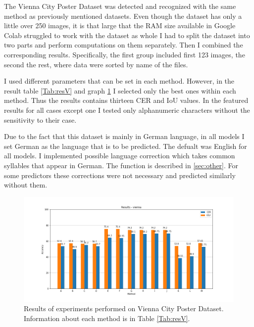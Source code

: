 The Vienna City Poster Dataset was detected and recognized with the same method as previously mentioned datasets. Even though the dataset has only a little over 250 images, it is that large that the RAM size available in Google Colab struggled to work with the dataset as whole I had to split the dataset into two parts and perform computations on them separately. Then I combined the corresponding results. Specifically, the first group included first 123 images, the second the rest, where data were sorted by name of the files.

I used different parameters that can be set in each method. However, in the result table \ref*{Tab:resV} and graph \ref*{Im:resV} I selected only the best ones within each method. Thus the results contains     thirteen CER and IoU values. In the featured results for all cases except one I tested only alphanumeric characters without the sensitivity to their case.

Due to the fact that this dataset is mainly in German language, in all models I set German as the language that is to be predicted. The defualt was English for all models. I implemented possible language correction which takes common syllables that appear in German. The function is described in \ref{sec:other}. For some predictors these corrections were not necessary and predicted similarly without them. 

\begin{figure}[hbtp!]
    \centering
    \includegraphics[width=\textwidth]{obrazky/grafy/resvienna.png}
    \caption{Results of experiments performed on Vienna City Poster Dataset. Information about each method is in Table \ref*{Tab:resV}.}
    \label{Im:resV}
\end{figure}

